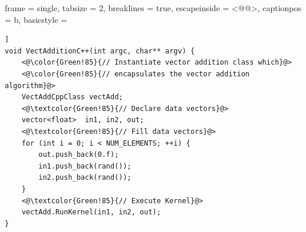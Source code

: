 \documentclass{sig-alternate-05-2015}
\begin{document}
 {
		frame			= single,
		tabsize			= 2,
		breaklines		= true,
		escapeinside	= {<@}{@>},
		captionpos		= b,
		basicstyle		=%
            \ttfamily
            \lst@ifdisplaystyle\scriptsize\fi 
}
    
\lstset{style=cppstyle}

\begin{lstlisting}[caption=Vector addition on the host using
\CPP.,label=vectcpp,float=[t!]]
void VectAdditionC++(int argc, char** argv) {
	<@\color{Green!85}{// Instantiate vector addition class which}@>
	<@\color{Green!85}{// encapsulates the vector addition algorithm}@>
	VectAddCppClass vectAdd;
	<@\textcolor{Green!85}{// Declare data vectors}@>
	vector<float>  in1, in2, out;
	<@\textcolor{Green!85}{// Fill data vectors}@>
	for (int i = 0; i < NUM_ELEMENTS; ++i) {
		out.push_back(0.f);
		in1.push_back(rand());
		in2.push_back(rand());
	}
	<@\textcolor{Green!85}{// Execute Kernel}@>
	vectAdd.RunKernel(in1, in2, out);
}
\end{lstlisting}
\end{document}
